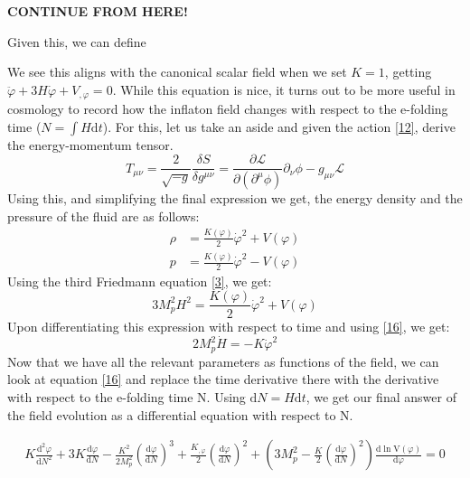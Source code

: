 \documentclass[aps,prd,reprint,preprintnumbers,showpacs,floatfix,nofootinbib,superscript address]{revtex4-2}
\begin{document}
    \textbf{CONTINUE FROM HERE!}
    
Given this, we can define 

We see this aligns with the canonical scalar field when we set $K = 1$, getting  $ \ddot{\varphi} +  3H \dot{\varphi}  + V_{,\varphi}   = 0$. While this equation is nice, it turns out to be more useful in cosmology to record how the inflaton field changes with respect to the e-folding time ($N = \int H \text{d}t$). For this, let us take an aside and given the action \ref{12}, derive the energy-momentum tensor.
\begin{equation} 
    T_{\mu\nu} = \frac{2}{\sqrt{-g}} \frac{\delta S}{\delta  g^{\mu \nu}} = \frac{\partial \mathcal{L}}{\partial (\partial^\mu \phi)} \partial_\nu \phi - g_{\mu\nu} \mathcal{L}
\end{equation}
Using this, and simplifying the final expression we get, the energy density and the pressure of the fluid are as follows: 
\begin{align}   \label{18}
    \rho &= \frac{K(\varphi)}{2} \dot{\varphi}^2 + V(\varphi) \nonumber \\
    p &= \frac{K(\varphi)}{2} \dot{\varphi}^2 - V(\varphi)
\end{align}
Using the third Friedmann equation \ref{3}, we get:
\begin{equation}    \label{19}
    3 M_p^2H^2 = \frac{K(\varphi)}{2} \dot{\varphi}^2 + V(\varphi)
\end{equation}
Upon differentiating this expression with respect to time and using \ref{16}, we get:
\begin{equation} \label{20}
    2 M_p^2 \dot{H} = -  K \dot{\varphi}^2
\end{equation}
Now that we have all the relevant parameters as functions of the field, we can look at equation \ref{16} and replace the time derivative there with the derivative with respect to the e-folding time N. Using $\text{d}N = H \text{d}t$, we get our final answer of the field evolution as a differential equation with respect to N.
\begin{widetext}
\begin{subequations}
\begin{align}\label{21}
    K\frac{\text{d}^2\varphi}{\text{d}N^2} +3 K \frac{\text{d}\varphi}{\text{d}N}  - \frac{K^2}{2M_p^2} \left(\frac{\text{d}\varphi}{\text{d}N} \right)^3  +  \frac{K_{,\varphi}}{2}  \left(\frac{\text{d}\varphi}{\text{d}N} \right)^2 +  \left( 3 M_p^2 - \frac{K}{2} \left(\frac{\text{d}\varphi}{\text{d}N} \right)^2 \right) \frac{\text{d}\ln \text{V}(\varphi)}{\text{d} \varphi} = 0    
\end{align}
\end{subequations}
\end{widetext}
\end{document}
